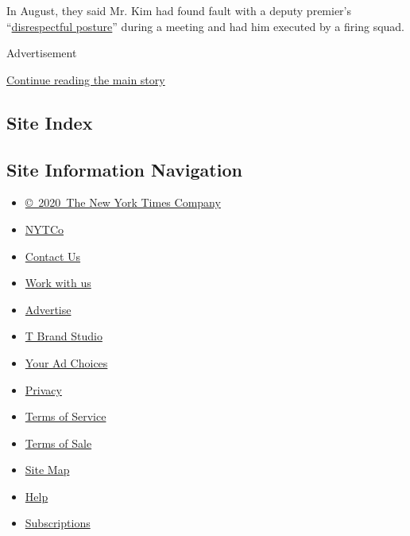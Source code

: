 In August, they said Mr. Kim had found fault with a deputy premier's
``\href{https://www.nytimes.com/2016/09/01/world/asia/north-korea-executes-deputy-premier.html?_r=0}{disrespectful
posture}'' during a meeting and had him executed by a firing squad.

Advertisement

\protect\hyperlink{after-bottom}{Continue reading the main story}

\hypertarget{site-index}{%
\subsection{Site Index}\label{site-index}}

\hypertarget{site-information-navigation}{%
\subsection{Site Information
Navigation}\label{site-information-navigation}}

\begin{itemize}
\tightlist
\item
  \href{https://help.nytimes.com/hc/en-us/articles/115014792127-Copyright-notice}{©~2020~The
  New York Times Company}
\end{itemize}

\begin{itemize}
\tightlist
\item
  \href{https://www.nytco.com/}{NYTCo}
\item
  \href{https://help.nytimes.com/hc/en-us/articles/115015385887-Contact-Us}{Contact
  Us}
\item
  \href{https://www.nytco.com/careers/}{Work with us}
\item
  \href{https://nytmediakit.com/}{Advertise}
\item
  \href{http://www.tbrandstudio.com/}{T Brand Studio}
\item
  \href{https://www.nytimes.com/privacy/cookie-policy\#how-do-i-manage-trackers}{Your
  Ad Choices}
\item
  \href{https://www.nytimes.com/privacy}{Privacy}
\item
  \href{https://help.nytimes.com/hc/en-us/articles/115014893428-Terms-of-service}{Terms
  of Service}
\item
  \href{https://help.nytimes.com/hc/en-us/articles/115014893968-Terms-of-sale}{Terms
  of Sale}
\item
  \href{https://spiderbites.nytimes.com}{Site Map}
\item
  \href{https://help.nytimes.com/hc/en-us}{Help}
\item
  \href{https://www.nytimes.com/subscription?campaignId=37WXW}{Subscriptions}
\end{itemize}
